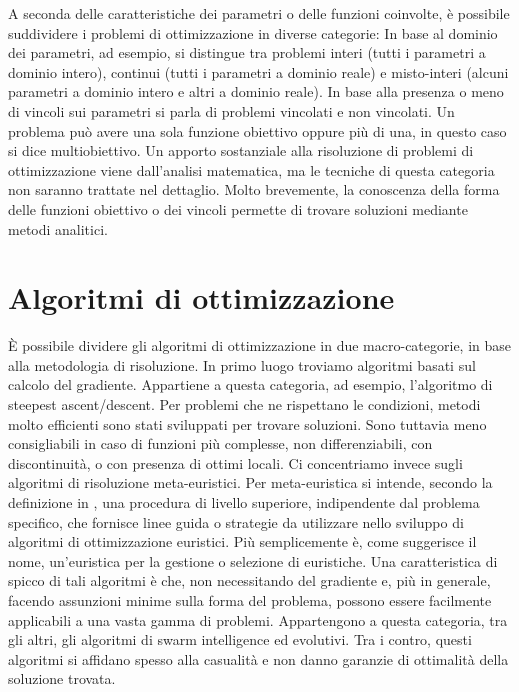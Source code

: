 \documentclass[12pt]{article}
\begin{document}
A seconda delle caratteristiche dei parametri o delle funzioni coinvolte, è possibile suddividere i problemi di ottimizzazione in diverse categorie: In base al dominio dei parametri, ad esempio, si distingue tra problemi interi (tutti i parametri a dominio intero), continui (tutti i parametri a dominio reale) e misto-interi (alcuni parametri a dominio intero e altri a dominio reale).\newline
In base alla presenza o meno di vincoli sui parametri si parla di problemi vincolati e non vincolati. Un problema può avere una sola funzione obiettivo oppure più di una, in questo caso si dice multiobiettivo. \newline
\newline
Un apporto sostanziale alla risoluzione di problemi di ottimizzazione viene dall'analisi matematica, ma le tecniche di questa categoria non saranno trattate nel dettaglio. Molto brevemente, la conoscenza della forma delle funzioni obiettivo o dei vincoli permette di trovare soluzioni mediante metodi analitici.\newline

\section*{\hfil Algoritmi di ottimizzazione\hfil}

È possibile dividere gli algoritmi di ottimizzazione in due macro-categorie, in base alla metodologia di risoluzione. In primo luogo troviamo algoritmi basati sul calcolo del gradiente. Appartiene a questa categoria, ad esempio, l'algoritmo di steepest ascent/descent.
Per problemi che ne rispettano le condizioni, metodi molto efficienti sono stati sviluppati per trovare soluzioni. Sono tuttavia meno consigliabili in caso di funzioni più complesse, non differenziabili, con discontinuità, o con presenza di ottimi locali.\newline
\newline
Ci concentriamo invece sugli algoritmi di risoluzione meta-euristici. Per meta-euristica si intende, secondo la definizione in \cite{SorensenGlover2003}, una procedura di livello superiore, indipendente dal problema specifico, che fornisce linee guida o strategie da utilizzare nello sviluppo di algoritmi di ottimizzazione euristici. Più semplicemente è, come suggerisce il nome, un'euristica per la gestione o selezione di euristiche. Una caratteristica di spicco di tali algoritmi è che, non necessitando del gradiente e, più in generale, facendo assunzioni minime sulla forma del problema, possono essere facilmente applicabili a una vasta gamma di problemi. Appartengono a questa categoria, tra gli altri, gli algoritmi di swarm intelligence ed evolutivi. Tra i contro, questi algoritmi si affidano spesso alla casualità e non danno garanzie di ottimalità della soluzione trovata.
\end{document}
